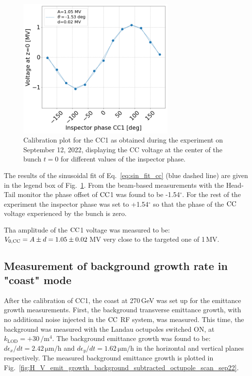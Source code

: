 \begin{figure}[!h] %
   \centering         
   \includegraphics[width=0.7\textwidth]{images/Ch8/Vcc_at_z_zero_vs_inspector_phase_CC1_for_thesis_sep22.png}
       \caption{Calibration plot for the CC1 as obtained during the experiment on September 12, 2022, displaying the CC voltage at the center of the bunch $t=0$ for different values of the inspector phase.}
       \label{fig:Vcc_calibration_md_sep2022}
\end{figure}

The results of the sinusoidal fit of Eq.~\eqref{eq:sin_fit_cc} (blue dashed line) are given in the legend box of Fig.~\ref{fig:Vcc_calibration_md_sep2022}. From the beam-based measurements with the Head-Tail monitor the phase offset of ${\mathrm{CC}}$1 was found to be -1.54$^\circ$. For the rest of the experiment the inspector phase was set to +1.54$^\circ$ so that the phase of the ${\mathrm{CC}}$ voltage experienced by the bunch is zero. 

Tha amplitude of the ${\mathrm{CC}}$1 voltage was measured to be: ${V_\mathrm{0, CC}}=A \pm d = 1.05 \pm 0.02$\,MV very close to the targeted one of 1\,MV.

\subsection{Measurement of background growth rate in "coast" mode}
After the calibration of CC1, the coast at 270\,GeV was set up for the emittance growth measurements. First, the background transverse emittance growth, with no additional noise injected in the ${\mathrm{CC}}$ RF system, was measured. This time, the background was measured with the Landau octupoles switched ON, at $k_\mathrm{LOD}=+30$\,$\mathrm{/m^4}$. The background emittance growth was found to be: $d\epsilon_x/dt=2.42$\,$\mathrm{\mu m/h}$ and $d\epsilon_y/dt=1.62$\,$\mathrm{\mu m/h}$ in the horizontal and vertical planes respectively. The measured background emittance growth is plotted in Fig.~\ref{fig:H_V_emit_growth_background_subtracted_octupole_scan_sep22}.

